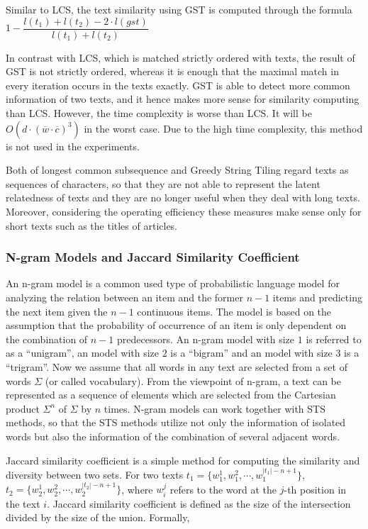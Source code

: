 Similar to LCS, the text similarity using GST is computed through the formula $1-\dfrac{l(t_1) + l(t_2) - 2 \cdot l(gst)}{l(t_1) + l(t_2)}$

In contrast with LCS, which is matched strictly ordered with texts, the result of GST is not strictly ordered, whereas it is enough that the maximal match in every iteration occurs in the texts exactly. GST is able to detect more common information of two texts, and it hence makes more sense for similarity computing than LCS. However, the time complexity is worse than LCS. It will be  $O(d \cdot (\overline{w} \cdot \overline{c})^3)$ in the worst case. Due to the high time complexity, this method is not used in the experiments.

Both of longest common subsequence and Greedy String Tiling regard texts as sequences of characters, so that they are not able to represent the latent relatedness of texts and they are no longer useful when they deal with long texts. Moreover, considering the operating efficiency these measures make sense only for short texts such as the titles of articles. 


\subsubsection{N-gram Models and Jaccard Similarity Coefficient}

An n-gram model is a common used type of probabilistic language model for analyzing the relation between an item and the former $n-1$ items and predicting the next item given the $n-1$ continuous items. The model is based on the assumption that the probability of occurrence of an item is only dependent on the combination of $n-1$ predecessors. An n-gram model with size $1$ is referred to as a ``unigram'', an model with size $2$ is a ``bigram'' and an model with size $3$ is a ``trigram''. Now we assume that all words in any text are selected from a set of words $\Sigma$ (or called vocabulary). From the viewpoint of n-gram, a text can be represented as a sequence of elements which are selected from the Cartesian product $\Sigma ^n$ of $\Sigma$ by $n$ times. N-gram models can work together with STS methods, so that the STS methods utilize not only the information of isolated words but also the information of the combination of several adjacent words. 

Jaccard similarity coefficient \cite{bank2008calculating} is a simple method for computing the similarity and diversity between two sets. For two texts $t_1=\{w^1_1, w^2_1, \cdots, w^{|t_1|-n+1}_1\}$, $t_2=\{w^1_2, w^2_2, \cdots, w^{|t_2|-n+1}_2\}$, where $w_i^j$ refers to the word at the $j$-th position in the text $i$. Jaccard similarity coefficient is defined as the size of the intersection divided by the size of the union. Formally,

